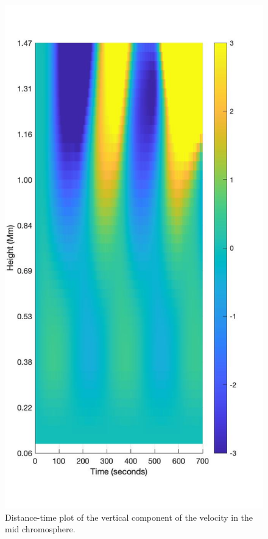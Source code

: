 \documentclass[twocolumn]{aastex62}
\begin{document}
\begin{figure}
\centering
\label{dt_vvert_100G_300s_180s}
\includegraphics[scale=0.3]{imrescale/dt-5b2_2_100G-midchrom.jpg}
\caption{Distance-time plot of the vertical component of the velocity in the mid chromosphere.}
\end{figure}
\end{document}
